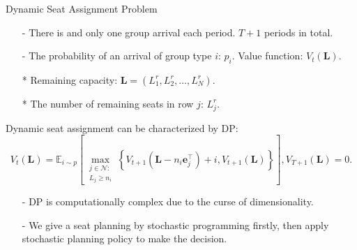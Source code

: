  \begin{frame}{Dynamic Seat Assignment Problem}
    \centering
    \small
    \begin{itemize}
    \item[-] There is and only one group arrival each period. $T+1$ periods in total.
    \item[-] The probability of an arrival of group type $i$: $p_i$. Value function: $V_{t}(\mathbf{L})$. 
    \item[*] Remaining capacity: $\mathbf{L} = (L^{r}_1, L^{r}_2, \ldots, L^{r}_{N})$.  
    \item[*] The number of remaining seats in row $j$: $L^{r}_{j}$. 
    \end{itemize}

    Dynamic seat assignment can be characterized by DP:
    $$V_{t}(\mathbf{L}) = \mathbb{E}_{i \sim p}\left[\max_{\substack{j \in \mathcal{N}: \\ L_j \geqslant {n}_{i}}}\left\{V_{t+1}\left(\mathbf{L}- n_{i}\mathbf{e}_j^{\intercal} \right)+ i, V_{t+1}(\mathbf{L})\right\}\right], V_{T+1}(\mathbf{L}) = 0.$$
    \small
    \begin{itemize}
      \item[-] DP is computationally complex due to the curse of dimensionality.
      \item[-] We give a seat planning by stochastic programming firstly, then apply stochastic planning policy to make the decision.
    \end{itemize}
\end{frame}
